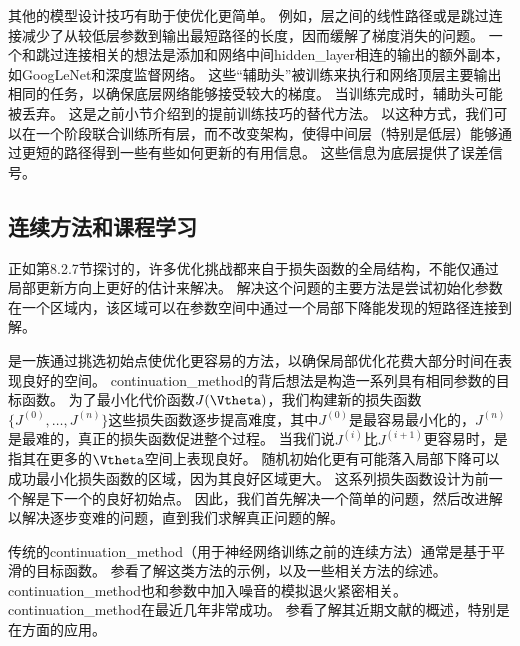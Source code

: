 其他的模型设计技巧有助于使优化更简单。
例如，层之间的线性路径或是跳过连接减少了从较低层参数到输出最短路径的长度，因而缓解了梯度消失的问题\citep{Srivastava-et-al-arxiv2015}。
一个和跳过连接相关的想法是添加和网络中间\gls{hidden_layer}相连的输出的额外副本，如GoogLeNet\citep{Szegedy-et-al-arxiv2014}和深度监督网络\citep{Lee-et-al-2014}。
这些“辅助头”被训练来执行和网络顶层主要输出相同的任务，以确保底层网络能够接受较大的梯度。
当训练完成时，辅助头可能被丢弃。
这是之前小节介绍到的提前训练技巧的替代方法。
以这种方式，我们可以在一个阶段联合训练所有层，而不改变架构，使得中间层（特别是低层）能够通过更短的路径得到一些有些如何更新的有用信息。
这些信息为底层提供了误差信号。


\subsection{连续方法和课程学习}
\label{sec:continuation_methods_and_curriculum_learning}
正如第8.2.7节探讨的，许多优化挑战都来自于损失函数的全局结构，不能仅通过局部更新方向上更好的估计来解决。
解决这个问题的主要方法是尝试初始化参数在一个区域内，该区域可以在参数空间中通过一个局部下降能发现的短路径连接到解。

是一族通过挑选初始点使优化更容易的方法，以确保局部优化花费大部分时间在表现良好的空间。
\gls{continuation_method}的背后想法是构造一系列具有相同参数的目标函数。
为了最小化代价函数$J(\Vtheta)$，我们构建新的损失函数$\{J^{(0)},\dots,J^{(n)}\}$这些损失函数逐步提高难度，其中$J^{(0)}$是最容易最小化的，$J^{(n)}$是最难的，真正的损失函数促进整个过程。
当我们说$J^{(i)}$比$J^{(i+1)}$更容易时，是指其在更多的$\Vtheta$空间上表现良好。
随机初始化更有可能落入局部下降可以成功最小化损失函数的区域，因为其良好区域更大。
这系列损失函数设计为前一个解是下一个的良好初始点。
因此，我们首先解决一个简单的问题，然后改进解以解决逐步变难的问题，直到我们求解真正问题的解。

传统的\gls{continuation_method}（用于神经网络训练之前的连续方法）通常是基于平滑的目标函数。
参看\cite{Wu-97}了解这类方法的示例，以及一些相关方法的综述。
\gls{continuation_method}也和参数中加入噪音的模拟退火紧密相关\citep{Kirkpatrick83}。
\gls{continuation_method}在最近几年非常成功。
参看\cite{Mobahi+Fisher-AAAI2015}了解其近期文献的概述，特别是在方面的应用。


